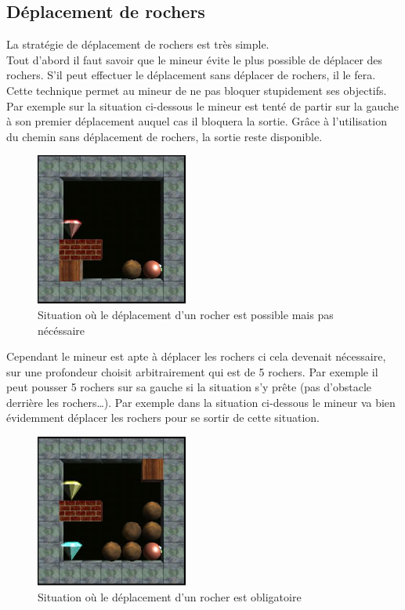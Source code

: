 \documentclass[a4paper,11pt]{article}
\begin{document}
	\newpage
	\subsection{D\'eplacement de rochers}
	
La strat\'egie de d\'eplacement de rochers est tr\`es simple.\\
Tout d'abord il faut savoir que le mineur \'evite le plus possible de d\'eplacer des rochers. S'il peut effectuer le d\'eplacement sans d\'eplacer de rochers, il le fera. Cette technique permet au mineur de ne pas bloquer stupidement ses objectifs. Par exemple sur la situation ci-dessous le mineur est tent\'e de partir sur la gauche \`a son premier d\'eplacement auquel cas il bloquera la sortie. Gr\^ace \`a l'utilisation du chemin sans d\'eplacement de rochers, la sortie reste disponible.

		\begin{figure}[h]
			\center
			\includegraphics[width=5cm]{rochers1}
			\caption{\label{deplacementRocher1} Situation o\`u le d\'eplacement d'un rocher est possible mais pas n\'ec\'essaire}
		\end{figure}
		
Cependant le mineur est apte \`a d\'eplacer les rochers ci cela devenait n\'ecessaire, sur une profondeur choisit arbitrairement qui est de 5 rochers. Par exemple il peut pousser 5 rochers sur sa gauche si la situation s'y pr\^ete (pas d'obstacle derri\`ere les rochers\dots). Par exemple dans la situation ci-dessous le mineur va bien \'evidemment d\'eplacer les rochers pour se sortir de cette situation.

		\begin{figure}[h]
			\center
			\includegraphics[width=5cm]{rochers2}
			\caption{\label{deplacementRocher2} Situation o\`u le d\'eplacement d'un rocher est obligatoire}
		\end{figure}
		
\end{document}
